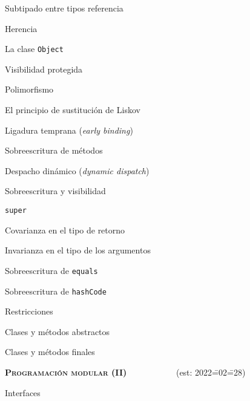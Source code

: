 \begin{longenum}
\begin{longenum}
\begin{longenum}
            \item Subtipado entre tipos referencia
            \item Herencia
            \item La clase \texttt{Object}
            \item Visibilidad protegida
        \end{longenum}
        \item Polimorfismo
        \begin{longenum}
            \item El principio de sustitución de Liskov
            \begin{longenum}
                \item Ligadura temprana (\textit{early binding})
            \end{longenum}
            \item Sobreescritura de métodos
            \begin{longenum}
                \item Despacho dinámico (\textit{dynamic dispatch})
                \item Sobreescritura y visibilidad
                \item \texttt{super}
                \item Covarianza en el tipo de retorno
                \item Invarianza en el tipo de los argumentos
                \item Sobreescritura de \texttt{equals}
                \item Sobreescritura de \texttt{hashCode}
            \end{longenum}
        \end{longenum}
        \item Restricciones
        \begin{longenum}
            \item Clases y métodos abstractos
            \item Clases y métodos finales
        \end{longenum}
    \end{longenum}
    \item \textbf{\textsc{Programación modular (II)}} \ \ \ \ \ \ \ \ \ \ \ (est: 2022\==02\==28)
    \begin{longenum}
        \item Interfaces
        \begin{longenum}

\end{longenum}
\end{longenum}
\end{longenum}
